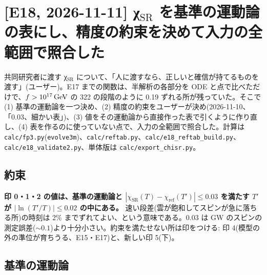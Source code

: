 \section{[E18, 2026-11-11] χ$_\mathrm{SR}$ を基準の運動論の表にし、精度の約束を決めて入力の全範囲で照合した}\label{sec:e18}

共同研究者に渡す χ$_\mathrm{SR}$ について、「人に渡すなら、正しいと確信が持てるものを渡す」(ユーザー)。E17 までの関数は、半解析の各部分を ODE と点で比べただけで、$f>10^{17}\,\mathrm{GeV}$ の 322 の段階のように 0.19 ずれる所が残っていた。そこで (1) 基準の運動論を一つ決め、(2) 精度の約束をユーザーが決め(2026-11-10、「0.03、細かい表」)、(3) 値をその運動論から直接作った表で引くように作り直し、(4) 表を作るのに使っていない点で、入力の全範囲で照合した。計算は \texttt{calc/fp3.py}(\texttt{evolve3m})、\texttt{calc/reftab.py}、\texttt{calc/e18\_reftab\_build.py}、\texttt{calc/e18\_validate2.py}、単体版は \texttt{calc/export\_chisr.py}。

\subsection{約束}

\textbf{印 0・1・2 の値は、基準の運動論と $|\chi_\mathrm{SR}(T)-\chi_\mathrm{ref}(T')|\le0.03$ を満たす $T'$ が $|\ln(T'/T)|\le0.02$ の中にある。}
速い段差(雲が飽和してスピンが急に落ちる所)の時刻は 2\% までずれてよい、という意味である。0.03 は GW のスピンの測定誤差($\sim0.1$)より十分小さい。約束を満たせない所は印をつける: 印 4(模型の外の準位が育ちうる、E15・E17)と、新しい印 5(下)。

\subsection{基準の運動論}

